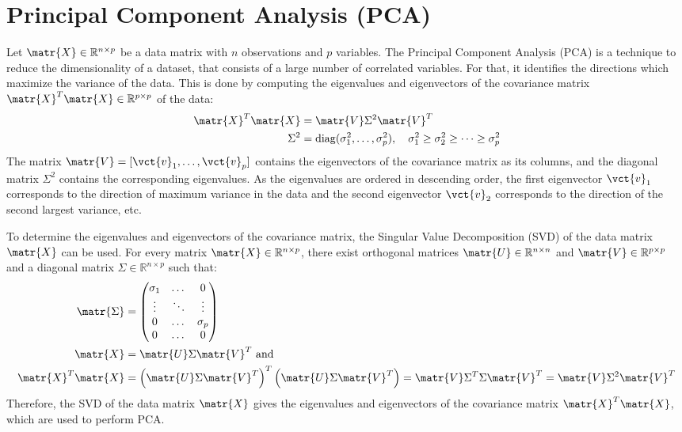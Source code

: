 \section{Principal Component Analysis (PCA)}
Let $\matr{X} \in \mathbb{R}^{n \times p}$ be a data matrix with $n$ observations and $p$ variables. The Principal Component Analysis (PCA) is a technique to reduce the dimensionality of a dataset, that consists of a large number of correlated variables.
For that, it identifies the directions which maximize the variance of the data.
This is done by computing the eigenvalues and eigenvectors of the covariance matrix $\matr{X}^T \matr{X} \in \mathbb{R}^{p \times p}$ of the data:
\begin{align}
    \matr{X}^T \matr{X} &= \matr{V} \Sigma^2 \matr{V}^T \\
    \Sigma^2 &= \mathrm{diag}(\sigma_1^2, \dots, \sigma_p^2), \quad \sigma_1^2 \geq \sigma_2^2 \geq \dots \geq \sigma_p^2
\end{align}
The matrix $\matr{V} = [\vct{v}_1, \dots, \vct{v}_p]$ contains the eigenvectors of the covariance matrix as its columns, and the diagonal matrix $\Sigma^2$ contains the corresponding eigenvalues.
As the eigenvalues are ordered in descending order, the first eigenvector $\vct{v}_1$ corresponds to the direction of maximum variance in the data and the second eigenvector $\vct{v}_2$ corresponds to the direction of the second largest variance, etc.

To determine the eigenvalues and eigenvectors of the covariance matrix, the Singular Value Decomposition (SVD) of the data matrix $\matr{X}$ can be used.
For every matrix $\matr{X} \in \mathbb{R}^{n \times p}$, there exist orthogonal matrices $\matr{U} \in \mathbb{R}^{n \times n}$ and $\matr{V} \in \mathbb{R}^{p \times p}$ and a diagonal matrix $\Sigma \in \mathbb{R}^{n \times p}$ such that:
\begin{align}
    \matr{\Sigma} &=
    \begin{pmatrix}
        \sigma_1  & \dots & 0 \\
        \vdots  & \ddots & \vdots \\
        0  & \dots & \sigma_p \\
        0  & \dots & 0
    \end{pmatrix} \\
    \matr{X} &= \matr{U} \Sigma \matr{V}^T  \text{ and } \\
    \matr{X}^T \matr{X} &= \left(\matr{U} \Sigma \matr{V}^T\right)^T \left(\matr{U} \Sigma \matr{V}^T\right) = \matr{V} \Sigma^T \Sigma \matr{V}^T = \matr{V} \Sigma^2 \matr{V}^T
\end{align}
Therefore, the SVD of the data matrix $\matr{X}$ gives the eigenvalues and eigenvectors of the covariance matrix $\matr{X}^T \matr{X}$, which are used to perform PCA.
\cite{Jolliffe2002} \cite{IntoliPCA} \cite{Richter2024}

